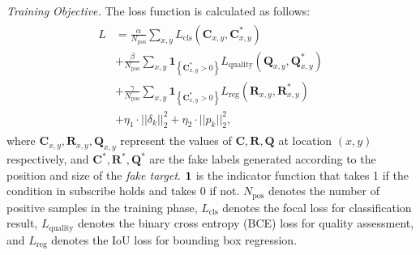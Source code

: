 \documentclass[journal]{IEEEtran}
\begin{document}
\textit{Training Objective.} The loss function is calculated as follows:
\begin{equation}
\begin{array}{l}
\begin{aligned}
L&=\frac{\alpha}{N_{\mathrm{pos}}} \sum_{x, y} L_{\mathrm{cls}}\left(\textbf{C}_{x, y}, \textbf{C}_{x, y}^{*}\right) \\
&+\frac{\beta}{N_{\mathrm{pos}}} \sum_{x, y} \textbf{1}_{\left\{\textbf{C}_{x, y}^{*}>0\right\}} L_{\mathrm{quality}}\left(\textbf{Q}_{x, y}, \textbf{Q}_{x, y}^{*}\right) \\
&+\frac{\gamma}{N_{\mathrm{pos}}} \sum_{x, y} \textbf{1}_{\left\{\textbf{C}_{x, y}^{*}>0\right\}} L_{\mathrm{reg}}\left(\textbf{R}_{x, y}, \textbf{R}_{x, y}^{*}\right) \\
&+\eta_1 \cdot ||\delta_k||_2^2 +  \eta_2 \cdot ||p_k||^2_2,
\end{aligned}
\end{array}
\label{eq:loss}
\end{equation}
where $\textbf{C}_{x, y}, \textbf{R}_{x, y}, \textbf{Q}_{x, y}$ represent the values of $\textbf{C}, \textbf{R}, \textbf{Q}$ at location $(x, y)$ respectively, and $\textbf{C}^*, \textbf{R}^*, \textbf{Q}^*$ are the fake labels generated according to the position and size of the \textit{fake target}. $\textbf 1$ is the indicator function that takes 1 if the condition in subscribe holds and takes 0 if not. $N_{\mathrm{pos}}$ denotes the number of positive samples in the training phase, $L_{\mathrm{cls}}$ denotes the focal loss \cite{focal} for classification result,
$L_{\mathrm{quality}}$ denotes the binary cross entropy (BCE) loss for quality assessment, and $L_{\mathrm{reg}}$ denotes the IoU loss \cite{iou-loss} for bounding box regression.
 
\end{document}
